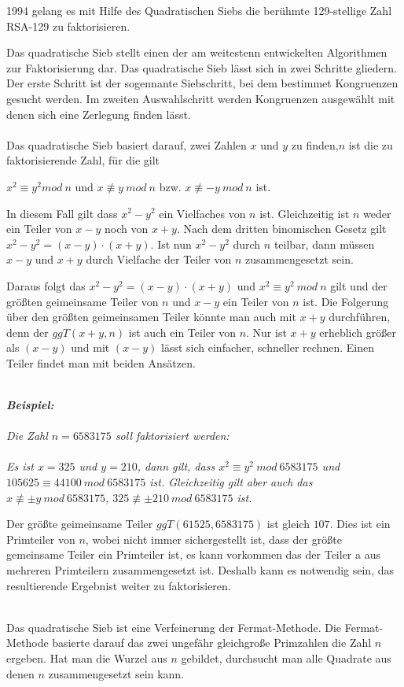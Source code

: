 \documentclass[a4paper,11pt]{article}
\begin{document}
1994 gelang es mit Hilfe des Quadratischen Siebs die berühmte 129-stellige
Zahl RSA-129 zu faktorisieren.

Das quadratische Sieb stellt einen der am weitestenn entwickelten Algorithmen
zur Faktorisierung dar. Das quadratische Sieb lässt sich in zwei Schritte
gliedern. Der erste Schritt ist der sogennante Siebschritt, bei dem bestimmet
Kongruenzen gesucht werden. Im zweiten Auswahlschritt werden Kongruenzen ausgewählt
mit denen sich eine Zerlegung finden lässt.\\\\
Das quadratische Sieb basiert darauf, zwei Zahlen $x$ und $y$ zu finden,$n$ ist die zu
faktorisierende Zahl, für die gilt
\begin{center}
$x^2 \equiv y^2 mod \ n$ und $x \not\equiv y\ mod \ n$ bzw. $x \not\equiv -y\ mod \ n$ ist.
\end{center}

In diesem Fall gilt dass $x^2-y^2$ ein Vielfaches von $n$ ist. Gleichzeitig ist $n$ weder
ein Teiler von $x-y$ noch von $x+y$. Nach dem dritten binomischen Gesetz gilt
$x^2 - y^2 = (x-y)\cdot(x+y)$. Ist nun $x^2 - y^2$ durch $n$ teilbar, dann müssen $x-y$ und
$x+y$ durch Vielfache der Teiler von $n$ zusammengesetzt sein.

Daraus folgt das $x^2-y^2 = (x-y)\cdot(x+y)$ und $x^2\equiv y^2 \ mod\ n$ gilt und der größten
geimeinsame Teiler von $n$ und $x-y$ ein Teiler von $n$ ist. Die Folgerung über den
größten geimeinsamen Teiler könnte man auch mit $x+y$ durchführen, denn der
$ggT(x+y,n)$ ist auch ein Teiler von $n$. Nur ist $x+y$ erheblich größer als $(x-y)$
und mit $(x-y)$ lässt sich einfacher, schneller rechnen. Einen Teiler findet man mit beiden
Ansätzen.\\\\
{\it
\textbf{Beispiel:}\\\\
Die Zahl $n=6583175$ soll faktorisiert werden:\\\\
Es ist $x = 325$ und $y = 210$, dann gilt,
dass $x^2 \equiv y^2\ mod\ 6583175$ und $105625 \equiv 44100\ mod\ 6583175$ ist.
Gleichzeitig gilt aber auch das
$x \not\equiv \pm y\ mod\ 6583175$, $325 \not\equiv \pm 210\ mod\ 6583175$ ist.


Der größte geimeinsame Teiler $ggT(61525,6583175)$ ist gleich $107$. Dies ist ein
Primteiler von $n$, wobei nicht immer sichergestellt ist, dass der größte
gemeinsame Teiler ein Primteiler ist, es kann vorkommen das der Teiler a
aus mehreren Primteilern zusammengesetzt ist. Deshalb kann es notwendig sein,
das resultierende Ergebnist weiter zu faktorisieren.\\\\
} %
Das quadratische Sieb ist eine Verfeinerung der Fermat-Methode. Die Fermat-Methode
basierte darauf das zwei ungefähr gleichgroße Primzahlen die Zahl $n$ ergeben.
Hat man die Wurzel aus $n$ gebildet, durchsucht man alle Quadrate aus denen
$n$ zusammengesetzt sein kann.
\end{document}
